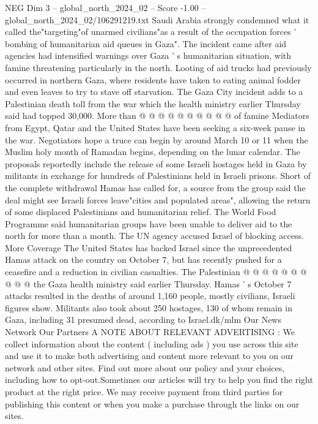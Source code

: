 \begin{textsample}{NEG Dim 3 – global\_north\_2024\_02 – Score -1.00 – global\_north\_2024\_02/106291219.txt}
Saudi Arabia strongly condemned what it called the"targeting"of unarmed civilians"as a result of the occupation forces ' bombing of humanitarian aid queues in Gaza".
The incident came after aid agencies had intensified warnings over Gaza ' s humanitarian situation, with famine threatening particularly in the north.
Looting of aid trucks had previously occurred in northern Gaza, where residents have taken to eating animal fodder and even leaves to try to stave off starvation.
The Gaza City incident adds to a Palestinian death toll from the war which the health ministry earlier Thursday said had topped 30,000.
More than @ @ @ @ @ @ @ @ @ @ of famine Mediators from Egypt, Qatar and the United States have been seeking a six-week pause in the war.
Negotiators hope a truce can begin by around March 10 or 11 when the Muslim holy month of Ramadan begins, depending on the lunar calendar.
The proposals reportedly include the release of some Israeli hostages held in Gaza by militants in exchange for hundreds of Palestinians held in Israeli prisons.
Short of the complete withdrawal Hamas has called for, a source from the group said the deal might see Israeli forces leave"cities and populated areas", allowing the return of some displaced Palestinians and humanitarian relief.
The World Food Programme said humanitarian groups have been unable to deliver aid to the north for more than a month.
The UN agency accused Israel of blocking access.
More Coverage The United States has backed Israel since the unprecedented Hamas attack on the country on October 7, but has recently pushed for a ceasefire and a reduction in civilian casualties.
The Palestinian @ @ @ @ @ @ @ @ @ @ the Gaza health ministry said earlier Thursday.
Hamas ' s October 7 attacks resulted in the deaths of around 1,160 people, mostly civilians, Israeli figures show.
Militants also took about 250 hostages, 130 of whom remain in Gaza, including 31 presumed dead, according to Israel.dk/mlm Our News Network Our Partners A NOTE ABOUT RELEVANT ADVERTISING : We collect information about the content ( including ads ) you use across this site and use it to make both advertising and content more relevant to you on our network and other sites.
Find out more about our policy and your choices, including how to opt-out.Sometimes our articles will try to help you find the right product at the right price.
We may receive payment from third parties for publishing this content or when you make a purchase through the links on our sites.

\end{textsample}
